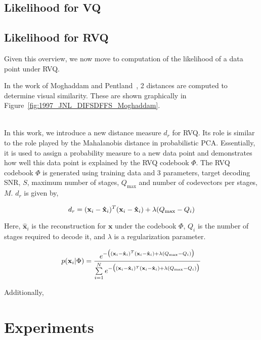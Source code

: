 \subsection{Likelihood for VQ}


\subsection{Likelihood for RVQ}
Given this overview, we now move to computation of the likelihood of a data point under RVQ.


In the work of Moghaddam and Pentland~\cite{1997_JNL_EigenTRK_Moghaddam}, 2 distances are computed to determine visual similarity.  These are shown graphically in Figure~\ref{fig:1997_JNL_DIFSDFFS_Moghaddam}.

\begin{equation}
\begin{array}{lllllll}

\end{array}
\end{equation}

In this work, we introduce a new distance measure $d_r$ for RVQ.  Its role is similar to the role played by the Mahalanobis distance in probabilistic PCA.  Essentially, it is used to assign a probability measure to a new data point and demonstrates how well this data point is explained by the RVQ codebook $\Phi$.  The RVQ codebook $\Phi$ is generated using training data and 3 parameters, target decoding SNR, $S$, maximum number of stages, $Q_{\textrm{max}}$ and number of codevectors per stages, $M$.  $d_r$ is given by,

\begin{equation}
d_r = (\mathbf{x}_i-\mathbf{\hat{x}}_i)^T(\mathbf{x}_i-\mathbf{\hat{x}}_i) + \lambda({Q_{\textrm{max}}-Q_i})
\end{equation}

Here, $\mathbf{\hat{x}}_i$ is the reconstruction for $\mathbf{x}$ under the codebook $\Phi$, $Q_i$ is the number of stages required to decode it, and $\lambda$ is a regularization parameter.

\begin{equation}
p(\mathbf{x}_i|\Phi) = \frac{e^{-\big((\mathbf{x}_i-\mathbf{\hat{x}}_i)^T(\mathbf{x}_i-\mathbf{\hat{x}}_i) + \lambda({Q_{\textrm{max}}-Q_i})\big)}} {\sum\limits_{i=1}^N e^{-\big((\mathbf{x}_i-\mathbf{\hat{x}}_i)^T(\mathbf{x}_i-\mathbf{\hat{x}}_i) + \lambda({Q_{\textrm{max}}-Q_i})\big)}}
\end{equation}

Additionally, 

\section{Experiments}


